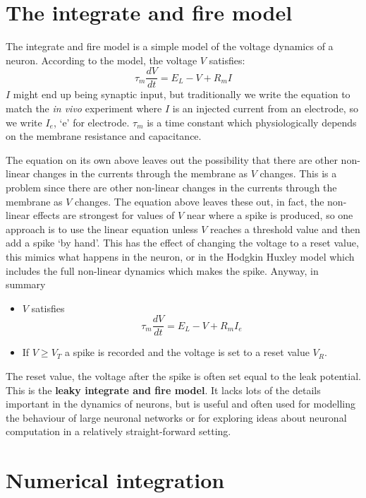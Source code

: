 \documentclass[12pt]{article}
\begin{document}
\section*{The integrate and fire model}

The integrate and fire model is a simple model of the voltage dynamics
of a neuron. According to the model, the voltage $V$ satisfies:
\begin{equation}
\tau_m\frac{dV}{dt}=E_L-V+R_mI
\end{equation}
$I$ might end up being synaptic input, but traditionally we write the
equation to match the \textsl{in vivo} experiment where $I$ is an
injected current from an electrode, so we write $I_e$, \lq{}e\rq{} for
electrode. $\tau_m$ is a time constant which physiologically depends
on the membrane resistance and capacitance. 

The equation on its own above leaves out the possibility that there
are other non-linear changes in the currents through the membrane as
$V$ changes. This is a problem since there are other non-linear
changes in the currents through the membrane as $V$ changes. The
equation above leaves these out, in fact, the non-linear effects are
strongest for values of $V$ near where a spike is produced, so one
approach is to use the linear equation unless $V$ reaches a threshold
value and then add a spike \lq{}by hand\rq{}. This has the effect of
changing the voltage to a reset value, this mimics what happens in the
neuron, or in the Hodgkin Huxley model which includes the full
non-linear dynamics which makes the spike. Anyway, in summary
\begin{itemize}
\item $V$ satisfies
\begin{equation}
\tau_m\frac{dV}{dt}=E_L-V+R_mI_e
\end{equation}
\item If $V\ge V_T$ a spike is recorded and the voltage is set to a
  reset value $V_R$.
\end{itemize}
The reset value, the voltage after the spike is often set equal to the
leak potential. This is the \textbf{leaky integrate and fire
  model}. It lacks lots of the details important in the dynamics of
neurons, but is useful and often used for modelling the behaviour of
large neuronal networks or for exploring ideas about neuronal
computation in a relatively straight-forward setting.

\section*{Numerical integration}
\end{document}
